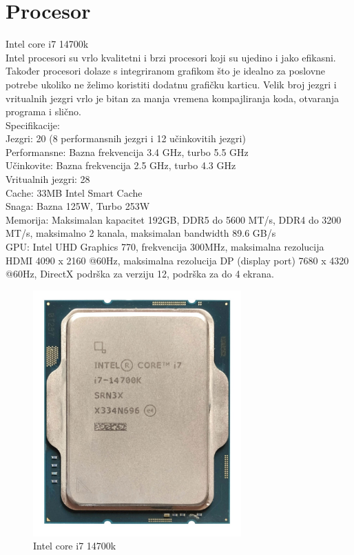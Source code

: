 \documentclass{report}
\begin{document}
\chapter{Procesor}
 Intel core i7 14700k
\\Intel procesori su vrlo kvalitetni i brzi procesori koji su ujedino i jako efikasni. Također procesori dolaze s integriranom grafikom što je idealno za poslovne potrebe ukoliko ne želimo koristiti dodatnu grafičku karticu. Velik broj jezgri i vritualnih jezgri vrlo je bitan za manja vremena kompajliranja koda, otvaranja programa i slično.
\\Specifikacije:
\\Jezgri: 20 (8 performansnih jezgri i 12 učinkovitih jezgri)
\\Performansne: Bazna frekvencija 3.4 GHz, turbo 5.5 GHz
\\Učinkovite: Bazna frekvencija 2.5 GHz, turbo 4.3 GHz
\\Vritualnih jezgri: 28
\\Cache: 33MB Intel Smart Cache
\\Snaga: Bazna 125W, Turbo 253W
\\Memorija: Maksimalan kapacitet 192GB, DDR5 do 5600 MT/s, DDR4 do 3200 MT/s, maksimalno 2 kanala, maksimalan bandwidth 89.6 GB/s
\\GPU: Intel UHD Graphics 770, frekvencija 300MHz, maksimalna rezolucija HDMI 4090 x 2160 @60Hz, maksimalna rezolucija DP (display port) 7680 x 4320 @60Hz, DirectX podrška za verziju 12, podrška za do 4 ekrana.
\begin{figure}[h]
\includegraphics[width=8cm]{Procesor.jpg}
\caption{Intel core i7 14700k}
\end{figure}
\end{document}
